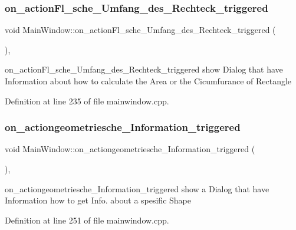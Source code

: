 \subsubsection{\texorpdfstring{on\+\_\+action\+Fl\+\_\+sche\+\_\+\+Umfang\+\_\+des\+\_\+\+Rechteck\+\_\+triggered}{on\_actionFl\_sche\_Umfang\_des\_Rechteck\_triggered}}
{\footnotesize\ttfamily void Main\+Window\+::on\+\_\+action\+Fl\+\_\+sche\+\_\+\+Umfang\+\_\+des\+\_\+\+Rechteck\+\_\+triggered (\begin{DoxyParamCaption}{ }\end{DoxyParamCaption})\hspace{0.3cm}{\ttfamily [private]}, {\ttfamily [slot]}}



on\+\_\+action\+Fl\+\_\+sche\+\_\+\+Umfang\+\_\+des\+\_\+\+Rechteck\+\_\+triggered show Dialog that have Information about how to calculate the Area or the Cicumfurance of Rectangle 



Definition at line 235 of file mainwindow.\+cpp.

\mbox{\label{class_main_window_a0aaf788d95e063d7320924549ded59aa}} 
\subsubsection{\texorpdfstring{on\+\_\+actiongeometriesche\+\_\+\+Information\+\_\+triggered}{on\_actiongeometriesche\_Information\_triggered}}
{\footnotesize\ttfamily void Main\+Window\+::on\+\_\+actiongeometriesche\+\_\+\+Information\+\_\+triggered (\begin{DoxyParamCaption}{ }\end{DoxyParamCaption})\hspace{0.3cm}{\ttfamily [private]}, {\ttfamily [slot]}}



on\+\_\+actiongeometriesche\+\_\+\+Information\+\_\+triggered show a Dialog that have Information how to get Info. about a spesific Shape 



Definition at line 251 of file mainwindow.\+cpp.

